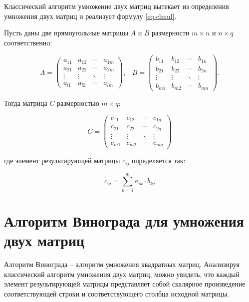 Классический алгоритм умножение двух матриц вытекает из определения умножения двух матриц и реализует формулу \ref{eq:clmul}.

Пусть даны две прямоугольные матрицы $A$ и $B$ размерности $m \times n$ и $n \times q$ соответственно:

\begin{equation*}
A = 
\begin{pmatrix} 
	a_{11} & a_{12} & \cdots & a_{1m} \\
	a_{21} & a_{22} & \cdots & a_{2m} \\ 
	\vdots & \vdots & \ddots & \vdots \\ 
	a_{l1} & a_{l2} & \cdots & a_{lm}
\end{pmatrix},\;\;\;
B =   
\begin{pmatrix} 
	b_{11} & b_{12} & \cdots & b_{1n} \\
	b_{21} & b_{22} & \cdots & b_{2n} \\ 
	\vdots & \vdots & \ddots & \vdots \\ 
	b_{m1} & b_{m2} & \cdots & b_{mn}
\end{pmatrix}.
\end{equation*}

Тогда матрица $C$ размерностью $m \times q$:

\begin{equation*}
C = 
\begin{pmatrix} 
	c_{11} & c_{12} & \cdots & c_{1q} \\
	c_{21} & c_{22} & \cdots & c_{2q} \\ 
	\vdots & \vdots & \ddots & \vdots \\ 
	c_{m1} & c_{m2} & \cdots & c_{mq}
\end{pmatrix} 
\end{equation*}

где элемент результирующей матрицы $c_{ij}$ определяется так:

\begin{equation}
	\label{eq:clmul}
	c_{ij} = \sum_{k=1}^m a_{ik} \cdot b_{kj}
\end{equation}

\section{Алгоритм Винограда для умножения двух матриц}

Алгоритм Винограда \cite{Vin} -- алгоритм умножения квадратных матриц. Анализируя классический алгоритм умножения двух матриц, можно увидеть, что каждый элемент результирующей матрицы представляет собой скалярное произведение соответствующей строки и соответствующего столбца исходной матрицы. 

